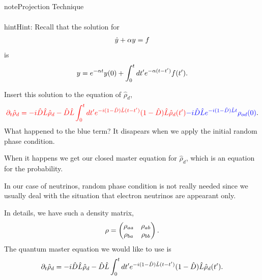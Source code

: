 \documentclass[letterpaper,12pt,english]{sphinxmanual}
\begin{document}
\begin{notice}{note}{Projection Technique}
\begin{gather}
\end{gather}
\begin{notice}{hint}{Hint:}
Recall that the solution for
\begin{gather}
\begin{split}\dot y + \alpha y = f\end{split}\notag
\end{gather}
is
\begin{gather}
\begin{split}y = e^{-\alpha t} y(0) + \int_0^t dt' e^{-\alpha (t-t')} f(t') .\end{split}\notag
\end{gather}\end{notice}

Insert this solution to the equation of \(\hat \rho_d\),
\begin{gather}
\begin{split}{\color{red}\partial_t \hat \rho_d = - i\hat D\hat L \hat \rho_d -  \hat D\hat L \int_0^t dt' e^{-i(1-\hat D) \hat L (t-t')}(1-\hat D)\hat L \hat \rho_d(t')} {\color{blue} - i \hat D \hat L e^{-i(1-\hat D)\hat L t} \rho_{od}(0) }.\end{split}\notag
\end{gather}
What happened to the blue term? It disapears when we apply the initial random phase condition.

When it happens we get our closed master equation for \(\hat \rho_d\), which is an equation for the probability.
\end{notice}

In our case of neutrinos, random phase condition is not really needed since we usually deal with the situation that electron neutrinos are appearant only.

In details, we have such a density matrix,
\begin{gather}
\begin{split}\mathbf\rho = \begin{pmatrix}\rho_{aa} &\rho_{ab} \\ \rho_{ba} & \rho_{bb}\end{pmatrix} .\end{split}\notag
\end{gather}
The quantum master equation we would like to use is
\begin{gather}
\begin{split}\partial_t \hat \rho_d = - i\hat D\hat L \hat \rho_d -  \hat D\hat L \int_0^t dt' e^{-i(1-\hat D) \hat L (t-t')}(1-\hat D)\hat L \hat \rho_d(t') .\end{split}\notag
\end{gather}
\end{document}
